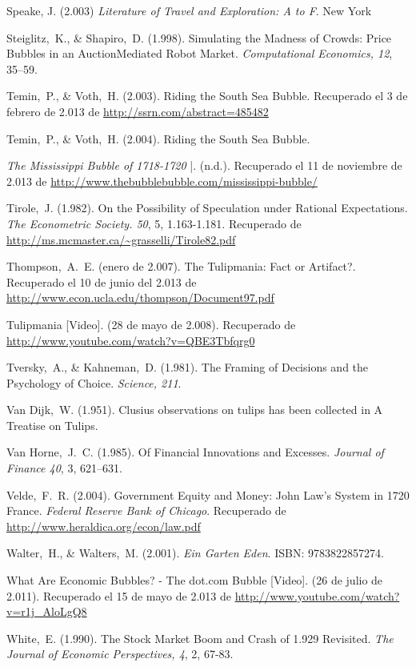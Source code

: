 \begin{thebibliography}{11}
	\bibitem{}
		 Speake, J. (2.003) \emph{Literature of Travel and Exploration: A to F}. New York	

	\bibitem{}
		Steiglitz, K., \& Shapiro, D. (1.998). Simulating the Madness of Crowds: Price Bubbles in an AuctionMediated Robot Market. \emph{Computational Economics, 12}, 35–59. 

	\bibitem{}
		Temin, P., \& Voth, H. (2.003). Riding the South Sea Bubble. Recuperado el 3 de febrero de 2.013 de \url{http://ssrn.com/abstract=485482}

	\bibitem{}
		Temin, P., \& Voth, H. (2.004). Riding the South Sea Bubble. 	

	\bibitem{}
		\emph{The Mississippi Bubble of 1718-1720} |. (n.d.). Recuperado el 11 de noviembre de 2.013 de \url{http://www.thebubblebubble.com/mississippi-bubble/}

	\bibitem{}
		Tirole, J. (1.982). On the Possibility of Speculation under Rational Expectations. \emph{The Econometric Society. 50}, 5, 1.163-1.181. Recuperado de \url{http://ms.mcmaster.ca/~grasselli/Tirole82.pdf}

	\bibitem{}
		Thompson, A. E. (enero de 2.007). The Tulipmania: Fact or Artifact?. Recuperado el 10 de junio del 2.013 de \url{http://www.econ.ucla.edu/thompson/Document97.pdf}

	\bibitem{}
		Tulipmania [Video]. (28 de mayo de 2.008). Recuperado de \url{http://www.youtube.com/watch?v=QBE3Tbfqrg0}

	\bibitem{}
		Tversky, A., \& Kahneman, D. (1.981). The Framing of Decisions and the Psychology of Choice. \emph{Science, 211}. 

	\bibitem{}
		Van Dijk, W. (1.951). Clusius observations on tulips has been collected in A Treatise on Tulips.

	\bibitem{}
		Van Horne, J. C. (1.985). Of Financial Innovations and Excesses. \emph{Journal of Finance 40}, 3, 621–631. 

	\bibitem{}
		Velde, F. R. (2.004). Government Equity and Money: John Law’s System in 1720 France. \emph{Federal Reserve Bank of Chicago}. Recuperado de \url{http://www.heraldica.org/econ/law.pdf}

	\bibitem{}
		Walter, H., \& Walters, M. (2.001). \emph{Ein Garten Eden}. ISBN: 9783822857274.	

	\bibitem{}
		What Are Economic Bubbles? - The dot.com Bubble [Video]. (26 de julio de 2.011). Recuperado el 15 de mayo de 2.013 de \url{http://www.youtube.com/watch?v=r1j\_AloLgQ8}

	\bibitem{}
		White, E. (1.990). The Stock Market Boom and Crash of 1.929 Revisited. \emph{The Journal of Economic Perspectives, 4}, 2, 67-83. 


\end{thebibliography}
